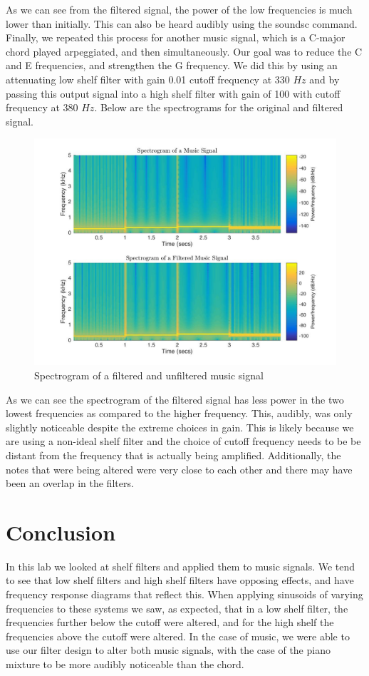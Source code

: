 \documentclass{article}
\begin{document}
\FloatBarrier
As we can see from the filtered signal, the power of the low frequencies is much lower than initially. This can also be heard audibly using the soundsc command. Finally, we repeated this process for another music signal, which is a C-major chord played arpeggiated, and then simultaneously. Our goal was to reduce the C and E frequencies, and strengthen the G frequency. We did this by using an attenuating low shelf filter with gain 0.01 cutoff frequency at 330 $\si{Hz}$ and by passing this output signal into a high shelf filter with gain 
of 100 with cutoff frequency at 380 $\si{Hz}$. Below are the spectrograms for the original and filtered signal.

 \begin{figure}[!htb]
        \centering
        \includegraphics[width=0.6\linewidth, height=0.3\textheight]{specmusic.jpg}
        \caption{Spectrogram of a filtered and unfiltered music signal}
\end{figure}
\FloatBarrier
As we can see the spectrogram of the filtered signal has less power in the two lowest frequencies as compared to the higher frequency. This, audibly, was only slightly noticeable despite the extreme choices in gain. This is likely because we are using a non-ideal shelf filter and the choice of cutoff frequency needs to be be distant from the frequency that is actually being amplified. Additionally, the notes that were being altered were very close to each other and there may have been an overlap in the filters. 

\section{Conclusion}
In this lab we looked at shelf filters and applied them to music signals. We tend to see that low shelf filters and high shelf filters have opposing effects, and have frequency response diagrams that reflect this. When applying sinusoids of varying frequencies to these systems we saw, as expected, that in a low shelf filter, the frequencies further below the cutoff were altered, and for the high shelf the frequencies above the cutoff were altered. In the case of music, we were able to use our filter design to alter both music signals, with the case of the piano mixture to be more audibly noticeable than the chord. 
\end{document}
